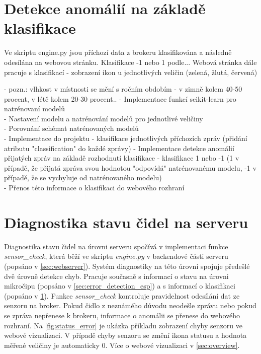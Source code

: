 \section{Detekce anomálií na základě klasifikace} \label{sec:detection_classification}

Ve skriptu engine.py jsou příchozí data z brokeru klasifikována a následně odesílána na webovou stránku. Klasifikace -1 nebo 1 podle... Webová stránka dále pracuje s klasifikací - zobrazení ikon u jednotlivých veličin (zelená, žlutá, červená)

- pozn.: vlhkost v místnosti se mění s ročním obdobím - v zimně kolem 40-50 procent, v létě kolem 20-30 procent..
- Implementace funkcí scikit-learn pro natrénovaní modelů \\
- Nastavení modelu a natrénování modelů pro jednotlivé veličiny \\
- Porovnání schémat natrénovaných modelů \\
- Implementace do projektu - klasifikace jednotlivých příchozích zpráv (přidání atributu "classification" do každé zprávy)
- Implementace detekce anomálií přijatých zpráv na základě rozhodnutí klasifikace - klasifikace 1 nebo -1 (1 v případě, že přijatá zpráva svou hodnotou "odpovídá" natrénovanému modelu, -1 v případě, že se vychyluje od natrénovaného modelu) \\
- Přenos této informace o klasifikaci do webového rozhraní \\

\section{Diagnostika stavu čidel na serveru} \label{sec:error_detection_server}
Diagnostika stavu čidel na úrovni serveru spočívá v implementaci funkce \textit{sensor\_check}, která běží ve skriptu \textit{engine.py} v backendové části serveru (popsáno v \cref{sec:webserver}). Systém diagnostiky na této úrovni spojuje předešlé dvě úrovně detekce chyb. Pracuje současně s informací o stavu na úrovni mikročipu (popsáno v \cref{sec:error_detection_esp}) a s informací o klasifikaci (popsáno v \cref{sec:detection_classification}). Funkce \textit{sensor\_check} kontroluje pravidelnost odesílání dat ze senzoru na broker. Pokud čidlo z neznámého důvodu neodešle zprávu nebo pokud se zpráva nepřenese k brokeru, informace o anomálii se přenese do webového rozhraní. Na \cref{fig:status_error} je ukázka příkladu zobrazení chyby senzoru ve webové vizualizaci. V případě chyby senzoru se změní ikona statusu a hodnota měřené veličiny je automaticky 0. Více o webové vizualizaci v \cref{sec:overview}.

